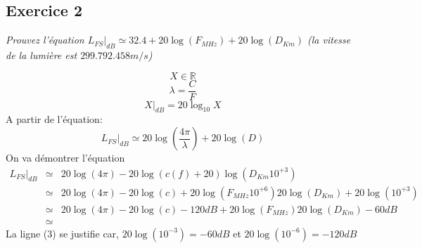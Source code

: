 \subsection{Exercice 2}
\textit{Prouvez l'équation $L_{FS}|_{dB} \simeq 32.4 + 20 \log(F_{MHz}) + 20 \log(D_{Km})$ (la vitesse de la lumière est $299.792.458 m/s$)}
\begin{framed}
	\[ X \in \mathbb{R} \]
	\[ \lambda = \frac{C}{F} \]
	\[ X|_{dB} = 20 \log_{10}X \]
	A partir de l'équation:
	\[ L_{FS}|_{dB} \simeq 20 \log(\frac{4\pi}{\lambda}) + 20 \log(D) \]
	On va démontrer l'équation
	\begin{eqnarray}
		L_{FS}|_{dB} &\simeq& 20 \log(4\pi) - 20 \log(c(f) + 20) \log(D_{Km} 10^{+3}) \\
		 &\simeq& 20 \log(4\pi) - 20 \log(c) + 20 \log(F_{MHz}10^{+6}) 20 \log(D_{Km}) + 20 \log(10^{+3})\\
		 &\simeq& 20 \log(4\pi) - 20 \log(c) -120dB + 20 \log(F_{MHz}) 20 \log(D_{Km}) -60dB\\
		 &\simeq&
	\end{eqnarray}
	La ligne (3) se justifie car, $20 \log(10^{-3}) = -60dB$ et  $20 \log(10^{-6}) = -120dB$
\end{framed}
